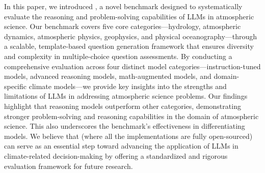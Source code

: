 In this paper, we introduced \name, a novel benchmark designed to systematically evaluate the reasoning and problem-solving capabilities of LLMs in atmospheric science. Our benchmark covers five core categories—hydrology, atmospheric dynamics, atmospheric physics, geophysics, and physical oceanography—through a scalable, template-based question generation framework that ensures diversity and complexity in multiple-choice question assessments. By conducting a comprehensive evaluation across four distinct model categories—instruction-tuned models, advanced reasoning models, math-augmented models, and domain-specific climate models—we provide key insights into the strengths and limitations of LLMs in addressing atmospheric science problems. Our findings highlight that reasoning models outperform other categories, demonstrating stronger problem-solving and reasoning capabilities in the domain of atmospheric science. This also underscores the benchmark's effectiveness in differentiating models. %
We believe that \name (where all the implementations are fully open-sourced) can serve as an essential step toward advancing the application of LLMs in climate-related decision-making by offering a standardized and rigorous evaluation framework for future research. 



\clearpage



